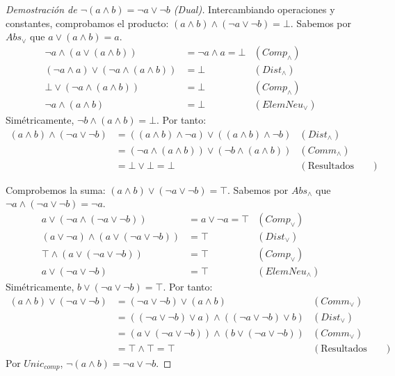 {\begin{proof}[Demostración de $\neg (a \wedge b) = \neg a \vee \neg b$ (Dual)]
Intercambiando operaciones y constantes, comprobamos el producto: $(a \wedge b) \wedge (\neg a \vee \neg b) = \bot$.
Sabemos por $Abs_\vee$ que $a \vee (a \wedge b) = a$.
\begin{align*}
    \neg a \wedge (a \vee (a \wedge b)) &= \neg a \wedge a = \bot & (Comp_\wedge) \\
    (\neg a \wedge a) \vee (\neg a \wedge (a \wedge b)) &= \bot & (Dist_\wedge) \\
    \bot \vee (\neg a \wedge (a \wedge b)) &= \bot & (Comp_\wedge) \\
    \neg a \wedge (a \wedge b) &= \bot & (ElemNeu_\vee)
\end{align*}
Simétricamente, $\neg b \wedge (a \wedge b) = \bot$.
Por tanto:
\begin{align*}
    (a \wedge b) \wedge (\neg a \vee \neg b) &= ((a \wedge b) \wedge \neg a) \vee ((a \wedge b) \wedge \neg b) & (Dist_\wedge) \\
    &= (\neg a \wedge (a \wedge b)) \vee (\neg b \wedge (a \wedge b)) & (Comm_\wedge) \\
    &= \bot \vee \bot = \bot & (\text{Resultados anteriores})
\end{align*}

Comprobemos la suma: $(a \wedge b) \vee (\neg a \vee \neg b) = \top$.
Sabemos por $Abs_\wedge$ que $\neg a \wedge (\neg a \vee \neg b) = \neg a$.
\begin{align*}
    a \vee (\neg a \wedge (\neg a \vee \neg b)) &= a \vee \neg a = \top & (Comp_\vee) \\
    (a \vee \neg a) \wedge (a \vee (\neg a \vee \neg b)) &= \top & (Dist_\vee) \\
    \top \wedge (a \vee (\neg a \vee \neg b)) &= \top & (Comp_\vee) \\
    a \vee (\neg a \vee \neg b) &= \top & (ElemNeu_\wedge)
\end{align*}
Simétricamente, $b \vee (\neg a \vee \neg b) = \top$.
Por tanto:
\begin{align*}
    (a \wedge b) \vee (\neg a \vee \neg b) &= (\neg a \vee \neg b) \vee (a \wedge b) & (Comm_\vee) \\
    &= ((\neg a \vee \neg b) \vee a) \wedge ((\neg a \vee \neg b) \vee b) & (Dist_\vee) \\
    &= (a \vee (\neg a \vee \neg b)) \wedge (b \vee (\neg a \vee \neg b)) & (Comm_\vee) \\
    &= \top \wedge \top = \top & (\text{Resultados anteriores})
\end{align*}
Por $Unic_{comp}$, $\neg (a \wedge b) = \neg a \vee \neg b$.
\end{proof}

}
